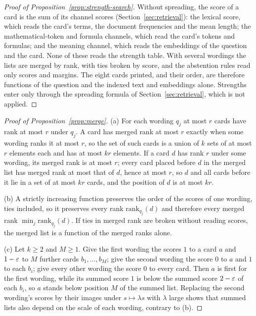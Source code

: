 \begin{proof}[Proof of Proposition~\ref{prop:strength-search}]\label{proof:prop:strength-search}
Without spreading, the score of a card is the sum of its channel scores (Section~\ref{sec:retrieval}): the lexical score, which reads the card's terms, the document frequencies and the mean length; the mathematical-token and formula channels, which read the card's tokens and formulas; and the meaning channel, which reads the embeddings of the question and the card. None of these reads the strength table. With several wordings the lists are merged by rank, with ties broken by score, and the abstention rules read only scores and margins. The eight cards printed, and their order, are therefore functions of the question and the indexed text and embeddings alone. Strengths enter only through the spreading formula of Section~\ref{sec:retrieval}, which is not applied.
\end{proof}

\begin{proof}[Proof of Proposition~\ref{prop:merge}]\label{proof:prop:merge}
(a) For each wording $q_j$ at most $r$ cards have rank at most $r$ under $q_j$. A card has merged rank at most $r$ exactly when some wording ranks it at most $r$, so the set of such cards is a union of $k$ sets of at most $r$ elements each and has at most $kr$ elements. If a card $d$ has rank $r$ under some wording, its merged rank is at most $r$; every card placed before $d$ in the merged list has merged rank at most that of $d$, hence at most $r$, so $d$ and all cards before it lie in a set of at most $kr$ cards, and the position of $d$ is at most $kr$.

(b) A strictly increasing function preserves the order of the scores of one wording, ties included, so it preserves every rank $\mathrm{rank}_{q_j}(d)$ and therefore every merged rank $\min_j\mathrm{rank}_{q_j}(d)$. If ties in merged rank are broken without reading scores, the merged list is a function of the merged ranks alone.

(c) Let $k\ge2$ and $M\ge1$. Give the first wording the scores $1$ to a card $a$ and $1-\varepsilon$ to $M$ further cards $b_1,\dots,b_M$; give the second wording the score $0$ to $a$ and $1$ to each $b_i$; give every other wording the score $0$ to every card. Then $a$ is first for the first wording, while its summed score $1$ is below the summed score $2-\varepsilon$ of each $b_i$, so $a$ stands below position $M$ of the summed list. Replacing the second wording's scores by their images under $s\mapsto\lambda s$ with $\lambda$ large shows that summed lists also depend on the scale of each wording, contrary to (b).
\end{proof}

